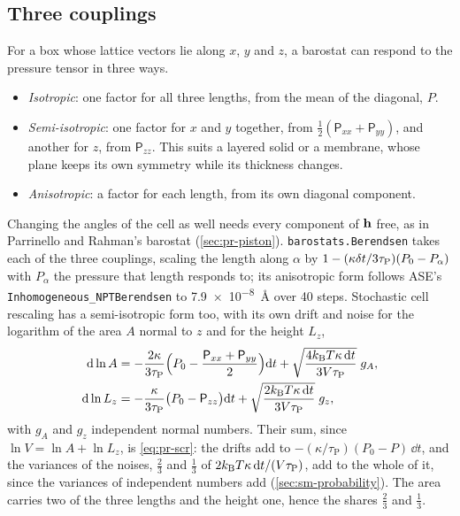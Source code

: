\subsection*{Three couplings}

For a box whose lattice vectors lie along $x$, $y$ and $z$, a barostat can
respond to the pressure tensor in three ways.
\begin{itemize}
\item \emph{Isotropic}: one factor for all three lengths, from the mean
   of the diagonal, $P$.
\item \emph{Semi-isotropic}: one factor for $x$ and $y$ together, from
   $\frac12(\mathsf{P}_{xx} + \mathsf{P}_{yy})$, and another for $z$, from
   $\mathsf{P}_{zz}$. This suits a layered solid or a
   membrane\cite{Bernetti2020}, whose plane keeps its own symmetry while
   its thickness changes.
\item \emph{Anisotropic}: a factor for each length, from its own diagonal
   component.
\end{itemize}
Changing the angles of the cell as well needs every component of
$\bm{\mathrm{h}}$ free, as in Parrinello and Rahman's barostat
(\cref{sec:pr-piston}). \texttt{barostats.Berendsen} takes each of the
three couplings, scaling the length along $\alpha$ by $1 - (\kappa\delta t/3
\tau_{\mathrm P})(P_0 - P_\alpha)$ with $P_\alpha$ the pressure that length
responds to; its anisotropic form follows ASE's
\texttt{Inhomogeneous\_NPTBerendsen} to \SI{7.9e-8}{\angstrom} over 40
steps.
Stochastic cell rescaling has a semi-isotropic form too, with its own
drift and noise for the logarithm of the area $A$ normal to $z$ and for
the height $L_z$\cite{Bernetti2020},
\begin{align*}
   \mathrm{d}\ln A &= -\frac{2\kappa}{3\tau_{\mathrm P}}\Bigl(P_0 -
   \frac{\mathsf{P}_{xx} + \mathsf{P}_{yy}}{2}\Bigr)\mathrm{d} t + \sqrt{\frac{4k_{\mathrm{B}} T
   \kappa\,\mathrm{d} t}{3V\tau_{\mathrm P}}}\;g_A ,\\
   \mathrm{d}\ln L_z &= -\frac{\kappa}{3\tau_{\mathrm P}}\bigl(P_0 - \mathsf{P}_{zz}
   \bigr)\mathrm{d} t + \sqrt{\frac{2k_{\mathrm{B}} T\kappa\,\mathrm{d} t}{3V\tau_{\mathrm P}}}\;g_z ,
\end{align*}
with $g_A$ and $g_z$ independent normal numbers. Their sum, since $\ln V =
\ln A + \ln L_z$, is \cref{eq:pr-scr}: the drifts add to
$-(\kappa/\tau_{\mathrm P})(P_0 - P)\,\dd t$, and the variances of the
noises, $\frac23$ and $\frac13$ of $2k_{\mathrm{B}} T\kappa\,\mathrm{d} t/(V\tau_{\mathrm
P})$, add to the whole of it, since the variances of independent numbers
add (\cref{sec:sm-probability}). The area carries two of the three
lengths and the height one, hence the shares $\frac23$ and $\frac13$.

